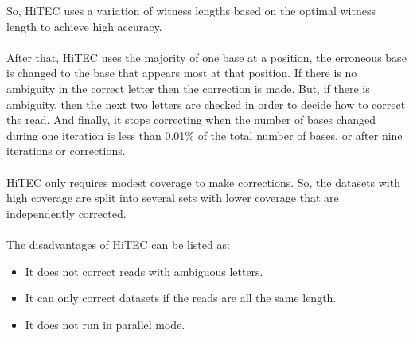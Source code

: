 \documentclass[12pt,openany]{llncs}
\begin{document}
So, HiTEC uses a variation of witness lengths based on the optimal witness length to achieve high accuracy.
\\
\\
After that, HiTEC uses the majority of one base at a position, the erroneous base is changed to the base that appears most at that position. If there is no ambiguity in the correct letter then the correction is made. But, if there is ambiguity, then the next two letters are checked in order to decide how to correct the read. And finally, it stops correcting when the number of bases changed during one iteration is less than 0.01\% of the total number of bases, or after nine iterations or corrections.
\\
\\
HiTEC only requires modest coverage to make corrections. So, the datasets with high coverage are split into several sets with lower coverage that are independently corrected. 
\\
\\
The disadvantages of HiTEC can be listed as:
\begin{itemize}
	\item It does not correct reads with ambiguous letters.
	\item It can only correct datasets if the reads are all the same length.
	\item It does not run in parallel mode.
\end{itemize}
\end{document}
